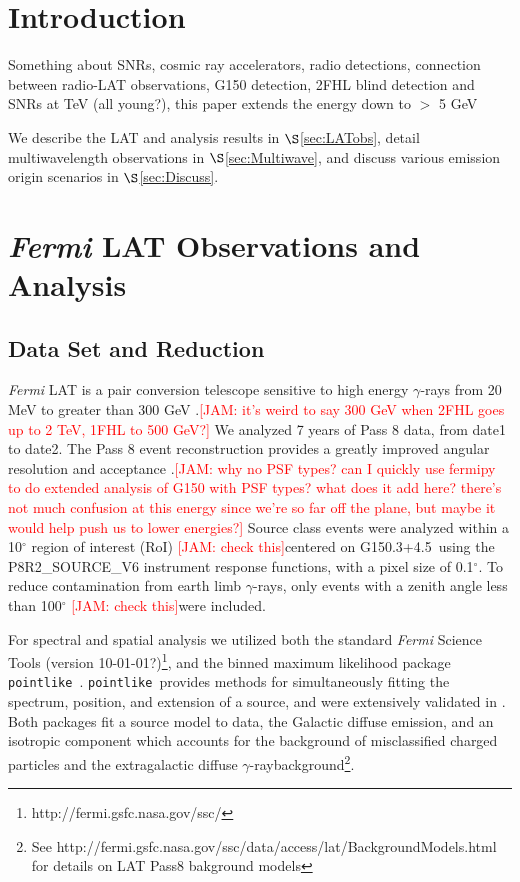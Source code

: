 \documentclass[preprint2]{aastex}
\newcommand{\kibitz}[2]{\ifnum\Comments=1\textcolor{#1}{#2}\fi}
\newcommand{\jamie}[1]{\kibitz{red}      {[JAM: #1]}}
\newcommand{\gam}{$\gamma$-ray}
\newcommand{\Fermi}{\emph{Fermi }}  %
\newcommand{\FermiLat}{\emph{Fermi} LAT }     %
\newcommand{\ptlike}{{\tt pointlike}}
\newcommand{\Gone}{G150.3+4.5}
\begin{document}
\section{Introduction} 



Something about SNRs, cosmic ray accelerators, radio detections, connection between radio-LAT observations, G150 detection, 2FHL blind detection and SNRs at TeV (all young?), this paper extends the energy down to $>$ 5 GeV

We describe the LAT and analysis results in $\S$\ref{sec:LATobs}, detail multiwavelength observations in $\S$\ref{sec:Multiwave}, and discuss various emission origin scenarios in $\S$\ref{sec:Discuss}.
%
%
\section{\label{sec:LATobs}\FermiLat  Observations and  Analysis }
\subsection{\label{sec:LATdata}Data Set and Reduction}
\FermiLat is a pair conversion telescope sensitive to high energy \gam s  from 20 MeV to greater than 300 GeV \citep{atwood09}.\jamie{it's weird to say  300 GeV when 2FHL goes up to 2 TeV, 1FHL to 500 GeV?} We analyzed 7 years of Pass 8 data, from date1 to date2. The  Pass 8 event reconstruction provides a greatly improved angular resolution and acceptance \citep{atwood13b,atwood13}.\jamie{why no PSF types? can I quickly use fermipy to do extended analysis of G150 with PSF types? what does it add here? there's not much confusion at this energy since we're so far off the plane, but maybe it would help push us to lower energies?} Source class events were analyzed within a 10$^{\circ}$ region of interest (RoI) \jamie{check this}centered on \Gone~using the P8R2\_SOURCE\_V6 instrument response functions, with a pixel size of 0.1$^{\circ}$. To reduce contamination from earth limb \gam s, only events with a zenith angle less than 100$^{\circ}$ \jamie{check this}were included. 

For spectral and spatial analysis we utilized both the standard \Fermi Science Tools (version 10-01-01?)\footnote[1]{http://fermi.gsfc.nasa.gov/ssc/}, and the binned maximum likelihood package \ptlike~\citep{Kerr10}. \ptlike~provides methods for simultaneously fitting the spectrum, position, and extension of a source, and were extensively validated in \cite{Lande12}. Both packages fit a source model to data, the Galactic diffuse emission, and an isotropic component which accounts for the background of misclassified charged particles and the extragalactic diffuse \gam background\footnote[2]{See http://fermi.gsfc.nasa.gov/ssc/data/access/lat/BackgroundModels.html for details on LAT Pass8 bakground models}.
\end{document}
